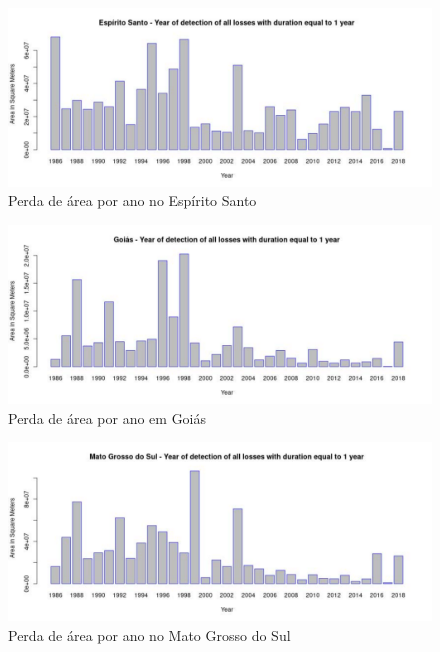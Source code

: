 \begin{figure}[H]
    \centering
    \includegraphics[scale=.5]{images/loss_graphics/Espirito_Santo_loss_eq1.pdf}
    \caption{Perda de área por ano no Espírito Santo}
    \label{fig:loss_espirito_santo}
\end{figure}

\begin{figure}[H]
    \centering
    \includegraphics[scale=.5]{images/loss_graphics/Goias_loss_eq1.pdf}
    \caption{Perda de área por ano em Goiás}
    \label{fig:loss_goias}
\end{figure}

\begin{figure}[H]
    \centering
    \includegraphics[scale=.5]{images/loss_graphics/Mato Grosso do Sul_loss_eq1.pdf}
    \caption{Perda de área por ano no Mato Grosso do Sul}
    \label{fig:loss_mato_grosso_sul}
\end{figure}


